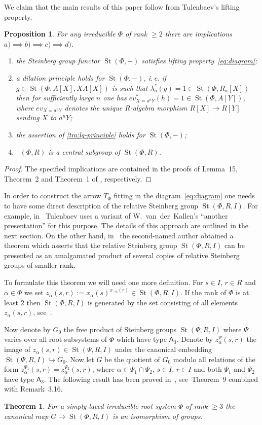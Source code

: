 \documentclass[11pt]{amsart}
\theoremstyle{plain} \declaretheorem[name=Theorem, Refname={Theorem,Theorems}]{tm} \Crefname{tm}{Theorem}{Theorems}
\numberwithin{equation}{section}
\newtheorem{prop}[lm]{Proposition} \Crefname{prop}{Proposition}{Propositions}
\newtheorem*{tm*}{Theorem}
\theoremstyle{definition} \newtheorem{df}[lm]{Definition} \Crefname{df}{Definition}{Definitions}
\theoremstyle{remark} \newtheorem{rk}[lm]{Remark} \Crefname{rk}{Remark}{Remarks}
\newcommand{\St}{\mathop{\mathrm{St}}\nolimits}
\newcommand{\Kt}{\mathop{\mathrm{K_2}}\nolimits}
\newcommand{\rA}{\mathsf{A}}
\begin{document}
We claim that the main results of this paper follow from Tulenbaev's lifting property.
\begin{prop} For any irreducible $\Phi$ of rank $\geq 2$ there are implications $a) \implies b) \implies c) \implies d)$.
\begin{enumerate}
 \item the Steinberg group functor $\St(\Phi, -)$ satisfies lifting property~\eqref{eq:diagram};
 \item a dilation principle holds for $\St(\Phi, -)$, i.\,e. if $g\in\St(\Phi, A[X], XA[X])$ is such that $\lambda_a^*(g) = 1 \in \St(\Phi, R_a[X])$ then
       for sufficiently large $n$ one has $ev_{X = a^n Y}^*(h) = 1 \in \St(\Phi, A[Y])$, where $ev_{X=a^n Y}$ denotes the unique $R$-algebra morphism $R[X]\to R[Y]$ sending $X$ to $a^nY$;
 \item the assertion of \cref{tm:lg-principle} holds for $\St(\Phi, -)$;
 \item $\Kt(\Phi, R)$ is a central subgroup of $\St(\Phi, R)$.
\end{enumerate} \end{prop}
\begin{proof} The specified implications are contained in the proofs of Lemma~15, Theorem~2 and Theorem~1 of \cite{SCh}, respectively. \end{proof}
     
In order to construct the arrow $T_\Phi$ fitting in the diagram~\eqref{eq:diagram} one needs to have some direct description of the relative Steinberg group $\St(\Phi, R, I)$.
For example, in~\cite{Tul} Tulenbaev uses a variant of W.~van~der~Kallen's ``another presentation'' for this purpose. The details of this approach are outlined in the next section.
On the other hand, in~\cite{SCh} the second-named author obtained a theorem which asserts that the relative Steinberg group $\St(\Phi, R, I)$ can be presented as an amalgamated product of
several copies of relative Steinberg groups of smaller rank. 

To formulate this theorem we will need one more definition.
For $s\in I$, $r\in R$ and $\alpha\in \Phi$ we set $z_\alpha(s, r) := x_\alpha(s)^{x_{-\alpha}(r)} \in \St(\Phi, R, I)$.
If the rank of $\Phi$ is at least $2$ then $\St(\Phi, R, I)$ is generated by the set consisting of all elements $z_\alpha(s,r)$, see~\cite[Lemma~5]{SCh}.

Now denote by $G_0$ the free product of Steinberg groups $\St(\Psi, R, I)$ where $\Psi$ varies over all root subsystems of $\Phi$ which have type $\rA_3$.
Denote by $z_\alpha^\Psi(s,r)$ the image of $z_\alpha(s,r)\in\St(\Psi, R, I)$ under the canonical embedding $\St(\Psi, R, I) \hookrightarrow G_0$.
Now let $G$ be the quotient of $G_0$ modulo all relations of the form $z_\alpha^{\Psi_1}(s, r) = z_\alpha^{\Psi_2}(s, r)$, where $\alpha\in\Psi_1\cap\Psi_2$, $s\in I$, $r\in I$ 
and both $\Psi_1$ and $\Psi_2$ have type $\rA_3$.
The following result has been proved in~\cite{SCh}, see~Theorem~9 combined with Remark~3.16.
\begin{tm*} \label{tm:relPres} For a simply laced irreducible root system $\Phi$ of rank $\geq 3$ the canonical map $G \rightarrow \St(\Phi, R, I)$ is an isomorphism of groups.
\end{tm*}
\end{document}
